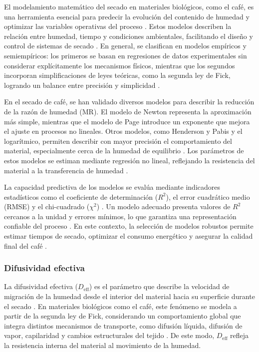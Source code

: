 El modelamiento matemático del secado en materiales biológicos, como el café, es una herramienta esencial para predecir la evolución del contenido de humedad y optimizar las variables operativas del proceso \parencite{p_romero_leiton_mathematical_2025}. Estos modelos describen la relación entre humedad, tiempo y condiciones ambientales, facilitando el diseño y control de sistemas de secado \parencite{liu_optimization_2025}. En general, se clasifican en modelos empíricos y semiempíricos: los primeros se basan en regresiones de datos experimentales sin considerar explícitamente los mecanismos físicos, mientras que los segundos incorporan simplificaciones de leyes teóricas, como la segunda ley de Fick, logrando un balance entre precisión y simplicidad \parencite{khan_determination_2017, phitakwinai_thinlayer_2019}.

En el secado de café, se han validado diversos modelos para describir la reducción de la razón de humedad (MR). El modelo de Newton representa la aproximación más simple, mientras que el modelo de Page introduce un exponente que mejora el ajuste en procesos no lineales. Otros modelos, como Henderson y Pabis y el logarítmico, permiten describir con mayor precisión el comportamiento del material, especialmente cerca de la humedad de equilibrio \parencite{p_romero_leiton_mathematical_2025, phitakwinai_thinlayer_2019}. Los parámetros de estos modelos se estiman mediante regresión no lineal, reflejando la resistencia del material a la transferencia de humedad \parencite{cansee_effect_2026}.

La capacidad predictiva de los modelos se evalúa mediante indicadores estadísticos como el coeficiente de determinación ($R^2$), el error cuadrático medio (RMSE) y el chi-cuadrado ($\chi^2$) \parencite{abdissa_harmonizing_2023}. Un modelo adecuado presenta valores de $R^2$ cercanos a la unidad y errores mínimos, lo que garantiza una representación confiable del proceso \parencite{guemouni_convective_2022}. En este contexto, la selección de modelos robustos permite estimar tiempos de secado, optimizar el consumo energético y asegurar la calidad final del café \parencite{amaral_simulation_2018, p_romero_leiton_mathematical_2025}.

\subsubsection{Difusividad efectiva}

La difusividad efectiva ($D_{\text{eff}}$) es el parámetro que describe la velocidad de migración de la humedad desde el interior del material hacia su superficie durante el secado \parencite{hadibi_effect_2025, khan_determination_2017}. En materiales biológicos como el café, este fenómeno se modela a partir de la segunda ley de Fick, considerando un comportamiento global que integra distintos mecanismos de transporte, como difusión líquida, difusión de vapor, capilaridad y cambios estructurales del tejido \parencite{el-mesery_application_2025-1, cansee_effect_2026}. De este modo, $D_{\text{eff}}$ refleja la resistencia interna del material al movimiento de la humedad.

